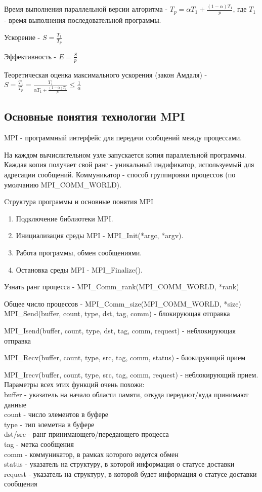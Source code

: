 \documentclass[a4paper]{article}
\begin{document}
Время выполнения параллельной версии алгоритма - $T_p = \alpha T_1 + \frac{(1-\alpha)T_1}{p}$,
 где $T_1$ - время выполнения последовательной программы. \par
Ускорение - $S= \frac{T_1}{T_p}$ \par
Эффективность - $E=\frac{S}{p}$ \par
Теоретическая оценка максимального ускорения (закон Амдаля) - $S=\frac{T_1}{T_p}=\frac{T_1}{\alpha T_1 + \frac{(1-\alpha)T_1}{p}} \leq \frac{1}{\alpha}$

\subsection{Основные понятия технологии MPI}

MPI - программный интерфейс для передачи сообщений между процессами. \par
На каждом вычислительном узле запускается копия параллельной программы. Каждая копия получает свой ранг - 
уникальный индификатор, используемый для адресации сообщений. Коммуникатор - способ группировки процессов (по умолчанию MPI\_COMM\_WORLD). \par
Cтруктура программы и основные понятия MPI
\begin{enumerate}
    \item Подключение библиотеки MPI.
    \item Инициализация среды MPI - MPI\_Init(*argc, *argv).
    \item Работа программы, обмен сообщениями.
    \item Остановка среды MPI - MPI\_Finalize().
\end{enumerate}

Узнать ранг процесса - MPI\_Comm\_rank(MPI\_COMM\_WORLD, *rank) \par
Общее число процессов  - MPI\_Comm\_size(MPI\_COMM\_WORLD, *size) \\

MPI\_Send(buffer, count, type, dst, tag, comm) - блокирующая отправка \par
MPI\_Isend(buffer, count, type, dst, tag, comm, request) - неблокирующая отправка \par
MPI\_Recv(buffer, count, type, src, tag, comm, status) - блокирующий прием \par 
MPI\_Irecv(buffer, count, type, src, tag, comm, request) - неблокирующий прием. \\

Параметры всех этих функций очень похожи: \\
buffer - указатель на начало области памяти, откуда передают/куда принимают данные \\
count - число элементов в буфере \\
type - тип элеметна в буфере \\
dst/src - ранг принимающего/передающего процесса \\
tag - метка сообщения \\
comm - коммуникатор, в рамках которого ведется обмен \\
status - указатель на структуру, в которой информация о статусе доставки \\
request - указатель на структуру, в которой будет информация о статусе доставки сообщения
\end{document}
